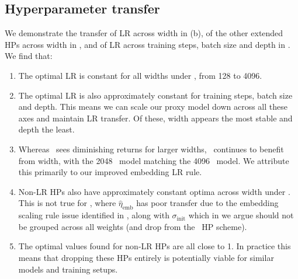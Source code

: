 \subsection{Hyperparameter transfer}


We demonstrate the transfer of LR across width in  (b), of the other extended HPs across width in , and of LR across training steps, batch size and depth in . We find that:

\begin{enumerate}
    \item The optimal LR is constant for all widths under \umup, from 128 to 4096.

    \item The optimal LR is also approximately constant for training steps, batch size and depth. This means we can scale our proxy model down across all these axes and maintain LR transfer. Of these, width appears the most stable and depth the least.

    \item Whereas \mup\ sees diminishing returns for larger widths, \umup\ continues to benefit from width, with the 2048 \umup\ model matching the 4096 \mup\ model. We attribute this primarily to our improved embedding LR rule.

    \item Non-LR HPs also have approximately constant optima across width under \umup. This is not true for \mup, where $\hat{\eta}_\mathrm{emb}$ has poor transfer due to the embedding scaling rule issue identified in , along with $\sigma_\mathrm{init}$ which in  we argue should not be grouped across all weights (and drop from the \umup\ HP scheme).

    \item The optimal values found for non-LR HPs are all close to 1. In practice this means that dropping these HPs entirely is potentially viable for similar models and training setups.
\end{enumerate}

